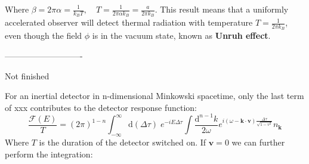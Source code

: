 \documentclass[12pt]{article}
\numberwithin{equation}{section}
\theoremstyle{1style}
\newcommand{\tbf}[1]{\textbf{#1}}
\newcommand{\id}{\mathrm{d}}
\begin{document}
Where \(\beta=2\pi\alpha=\frac{1}{k_BT},\quad T=\frac{1}{2\pi\alpha k_B}=\frac{a}{2\pi k_B}\).
This result means that a uniformly accelerated observer will detect thermal radiation with temperature \(T=\frac{1}{2\pi k_B}\),
even though the field \(\phi\) is in the vacuum state, known as \tbf{Unruh effect}.













\newpage
----------------------------

Not finished





For an inertial detector in n-dimensional Minkowski spacetime, only the last term of xxx contributes to the detector response function:
\begin{equation}
  \frac{\mathcal{F}(E)}{T}=(2\pi)^{1-n}\int^{\infty}_{-\infty}\id (\Delta \tau)\;e^{-iE\Delta\tau}
  \int\frac{\id^{n-1}k}{2\omega}e^{i(\omega-\mathbf{k}\cdot\mathbf{v})\frac{\Delta\tau}{\sqrt{1-v^2}}}n_{\mathbf{k}}
\end{equation}
Where \(T\) is the duration of the detector switched on. If \(\mathbf{v}=0\) we can further perform the integration:
\end{document}
